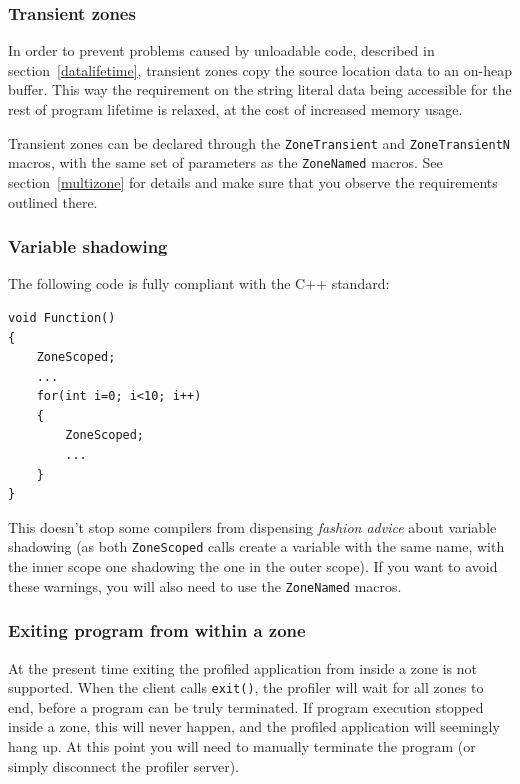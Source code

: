 \documentclass[hidelinks,titlepage,a4paper]{article}
\begin{document}
\subsubsection{Transient zones}
\label{transientzones}

In order to prevent problems caused by unloadable code, described in section~\ref{datalifetime}, transient zones copy the source location data to an on-heap buffer. This way the requirement on the string literal data being accessible for the rest of program lifetime is relaxed, at the cost of increased memory usage.

Transient zones can be declared through the \texttt{ZoneTransient} and \texttt{ZoneTransientN} macros, with the same set of parameters as the \texttt{ZoneNamed} macros. See section~\ref{multizone} for details and make sure that you observe the requirements outlined there.

\subsubsection{Variable shadowing}

The following code is fully compliant with the C++ standard:

\begin{lstlisting}
void Function()
{
	ZoneScoped;
	...
	for(int i=0; i<10; i++)
	{
		ZoneScoped;
		...
	}
}
\end{lstlisting}

This doesn't stop some compilers from dispensing \emph{fashion advice} about variable shadowing (as both \texttt{ZoneScoped} calls create a variable with the same name, with the inner scope one shadowing the one in the outer scope). If you want to avoid these warnings, you will also need to use the \texttt{ZoneNamed} macros.

\subsubsection{Exiting program from within a zone}

At the present time exiting the profiled application from inside a zone is not supported. When the client calls \texttt{exit()}, the profiler will wait for all zones to end, before a program can be truly terminated. If program execution stopped inside a zone, this will never happen, and the profiled application will seemingly hang up. At this point you will need to manually terminate the program (or simply disconnect the profiler server).
\end{document}
